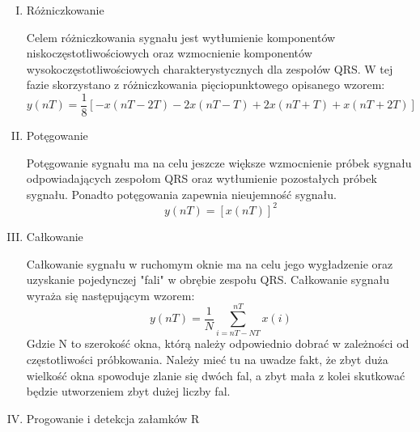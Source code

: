 \begin{enumerate}[I.]
\item Różniczkowanie

Celem różniczkowania sygnału jest wytłumienie komponentów niskoczęstotliwościowych oraz wzmocnienie komponentów wysokoczęstotliwościowych charakterystycznych dla zespołów QRS. W tej fazie skorzystano z różniczkowania pięciopunktowego opisanego wzorem:
\begin{equation}
y(nT)=\frac{1}{8}[-x(nT-2T)-2x(nT-T)+2x(nT+T)+x(nT+2T)]
\end{equation}
\item Potęgowanie

Potęgowanie sygnału ma na celu jeszcze większe wzmocnienie próbek sygnału odpowiadających zespołom QRS oraz wytłumienie pozostałych próbek sygnału. Ponadto potęgowania zapewnia nieujemność sygnału.
\begin{equation}
y(nT)=[x(nT)]^2
\end{equation}
\item Całkowanie

Całkowanie sygnału w ruchomym oknie ma na celu jego wygładzenie oraz uzyskanie pojedynczej "fali" w obrębie zespołu QRS. Całkowanie sygnału wyraża się następującym wzorem:
\begin{equation}
y(nT)=\frac{1}{N}\sum\limits_{i=nT-NT}^{nT} x(i)
\end{equation}
Gdzie N to szerokość okna, którą należy odpowiednio dobrać w zależności od częstotliwości próbkowania. Należy mieć tu na uwadze fakt, że zbyt duża wielkość okna spowoduje zlanie się dwóch fal, a zbyt mała z kolei skutkować będzie utworzeniem zbyt dużej liczby fal.
\item Progowanie i detekcja załamków R


\end{enumerate}
